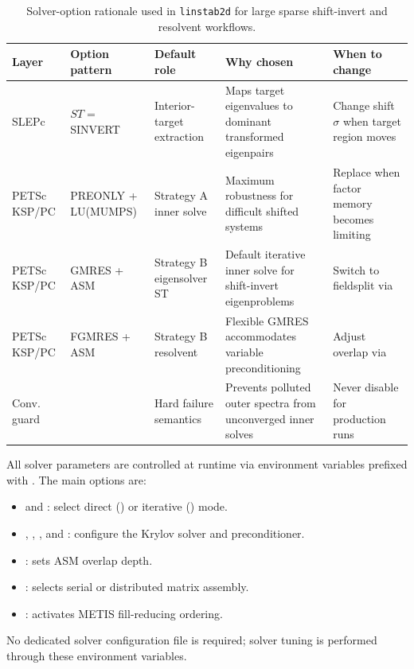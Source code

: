 \documentclass[11pt]{article}
\begin{document}
\begin{table}[t]
\centering
\footnotesize
\setlength{\tabcolsep}{4pt}
\begin{tabular}{L{1.7cm}L{2.7cm}L{2.8cm}L{3.0cm}L{3.2cm}}
\toprule
Layer & Option pattern & Default role & Why chosen & When to change \\
\midrule
SLEPc & $ST=$ SINVERT & Interior-target extraction & Maps target eigenvalues to dominant transformed eigenpairs & Change shift $\sigma$ when target region moves \\
PETSc KSP/PC & PREONLY + LU(MUMPS) & Strategy A inner solve & Maximum robustness for difficult shifted systems & Replace when factor memory becomes limiting \\
PETSc KSP/PC & GMRES + ASM & Strategy B eigensolver ST & Default iterative inner solve for shift-invert eigenproblems & Switch to fieldsplit via  \\
PETSc KSP/PC & FGMRES + ASM & Strategy B resolvent & Flexible GMRES accommodates variable preconditioning & Adjust overlap via  \\
Conv. guard &  & Hard failure semantics & Prevents polluted outer spectra from unconverged inner solves & Never disable for production runs \\
\bottomrule
\end{tabular}
\caption{Solver-option rationale used in \texttt{linstab2d} for large sparse shift-invert and resolvent workflows.}
\label{tab:solver_rationale}
\end{table}

All solver parameters are controlled at runtime via environment variables prefixed with .
The main options are:
\begin{itemize}
\item {} and : select direct () or iterative () mode.
\item {}, , , and : configure the Krylov solver and preconditioner.
\item {}: sets ASM overlap depth.
\item {}: selects serial or distributed matrix assembly.
\item {}: activates METIS fill-reducing ordering.
\end{itemize}
No dedicated solver configuration file is required; solver tuning is performed through these environment variables.
\end{document}

